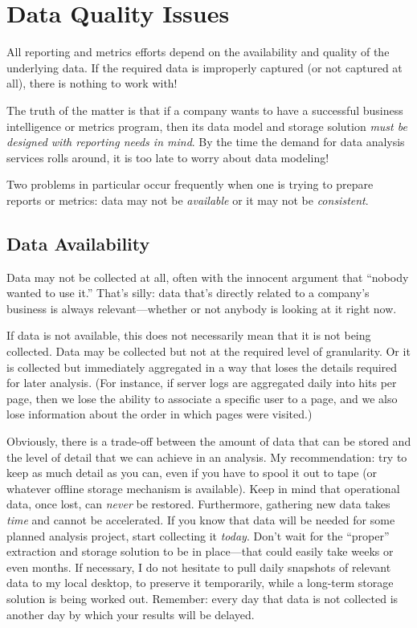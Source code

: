 \section{Data Quality Issues}


All reporting and metrics efforts depend on the availability and
quality of the underlying data. If the required data is improperly
captured (or not captured at all), there is nothing to work with!

The truth of the matter is that if a company wants to have a
successful business intelligence or metrics program, then its data
model and storage solution \emph{must be designed with reporting needs
  in mind}. By the time the demand for data analysis services rolls
around, it is too late to worry about data modeling!

Two problems in particular occur frequently when one is trying to
prepare reports or metrics: data may not be \emph{available} or it may
not be \emph{consistent}.

\vspace*{-6pt}
\subsection{Data Availability}

 
Data may not be collected at all, often with the innocent argument
that ``nobody wanted to use it.'' That's silly: data that's directly
related to a company's business is always relevant---whether or not
anybody is looking at it right now.

If data is not available, this does not necessarily mean that it is
not being collected. Data may be collected but not at the required
level of granularity. Or it is collected but immediately aggregated in
a way that\vadjust{\pagebreak} loses the details required for later analysis. (For
instance, if server logs are aggregated daily into hits per page, then
we lose the ability to associate a specific user to a page, and we also
lose information about the order in which pages were visited.)
    
Obviously, there is a trade-off between the amount of data that can be
stored and the level of detail that we can achieve in an analysis. My
recommendation: try to keep as much detail as you can, even if you
have to spool it out to tape (or whatever offline storage mechanism is
available). Keep in mind that operational data, once lost, can
\emph{never} be restored. Furthermore, gathering new data takes
\emph{time} and cannot be accelerated.  If you know that data will be
needed for some planned analysis project, start collecting it
\emph{today}. Don't wait for the ``proper'' extraction and storage
solution to be in place---that could easily take weeks or even months.
If necessary, I do not hesitate to pull daily snapshots of relevant
data to my local desktop, to preserve it temporarily, while a
long-term storage solution is being worked out. Remember: every day
that data is not collected is another day by which your results will
be delayed.
    
